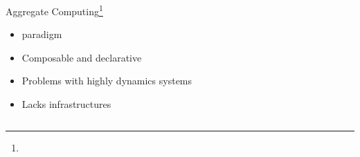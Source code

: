 \begin{frame}{Aggregate Computing\footnote[frame]{}}
  \begin{cardTiny}
    \begin{itemize}
      \item[\success{\faThumbsUp}]  paradigm
      \item[\success{\faThumbsUp}] Composable and declarative 
      \item[{\color{materialRed} \faThumbsDown}] Problems with highly dynamics systems
      \item[{\color{materialRed} \faThumbsDown}] Lacks infrastructures
    \end{itemize}
  \end{cardTiny}

  \begin{columns}
    \begin{column}{0.41\textwidth}
    \end{column}
    \begin{column}{0.25\textwidth}
    \end{column}
  \end{columns}
\end{frame}
